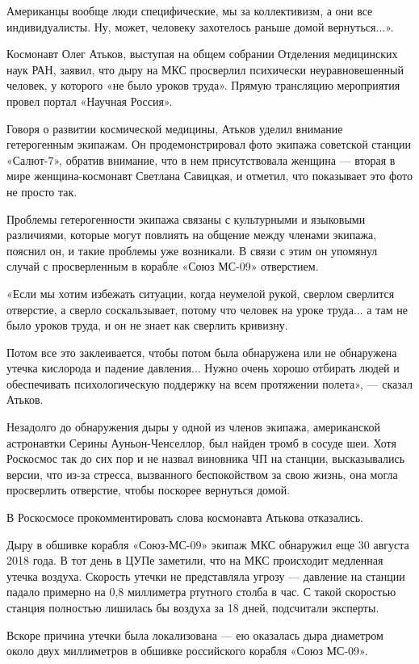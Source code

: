 \begin{itemize}
Американцы вообще люди специфические, мы за коллективизм, а они все
индивидуалисты. Ну, может, человеку захотелось раньше домой вернуться...».

Космонавт Олег Атьков, выступая на общем собрании Отделения медицинских наук
РАН, заявил, что дыру на МКС просверлил психически неуравновешенный человек, у
которого «не было уроков труда». Прямую трансляцию мероприятия провел портал
«Научная Россия».

Говоря о развитии космической медицины, Атьков уделил внимание гетерогенным
экипажам. Он продемонстрировал фото экипажа советской станции «Салют-7»,
обратив внимание, что в нем присутствовала женщина — вторая в мире
женщина-космонавт Светлана Савицкая, и отметил, что показывает это фото не
просто так.

Проблемы гетерогенности экипажа связаны с культурными и языковыми различиями,
которые могут повлиять на общение между членами экипажа, пояснил он, и такие
проблемы уже возникали. В связи с этим он упомянул случай с просверленным в
корабле «Союз МС-09» отверстием.

«Если мы хотим избежать ситуации, когда неумелой рукой, сверлом сверлится
отверстие, а сверло соскальзывает, потому что человек на уроке труда... а там
не было уроков труда, и он не знает как сверлить кривизну.

Потом все это заклеивается, чтобы потом была обнаружена или не обнаружена
утечка кислорода и падение давления... Нужно очень хорошо отбирать людей и
обеспечивать психологическую поддержку на всем протяжении полета», — сказал
Атьков.

Незадолго до обнаружения дыры у одной из членов экипажа, американской
астронавтки Серины Ауньон-Ченселлор, был найден тромб в сосуде шеи. Хотя
Роскосмос так до сих пор и не назвал виновника ЧП на станции, высказывались
версии, что из-за стресса, вызванного беспокойством за свою жизнь, она могла
просверлить отверстие, чтобы поскорее вернуться домой.

В Роскосмосе прокомментировать слова космонавта Атькова отказались.

Дыру в обшивке корабля «Союз-МС-09» экипаж МКС обнаружил еще 30 августа 2018
года. В тот день в ЦУПе заметили, что на МКС происходит медленная утечка
воздуха. Скорость утечки не представляла угрозу — давление на станции падало
примерно на 0,8 миллиметра ртутного столба в час. С такой скоростью станция
полностью лишилась бы воздуха за 18 дней, подсчитали эксперты.

Вскоре причина утечки была локализована — ею оказалась дыра диаметром около
двух миллиметров в обшивке российского корабля «Союз МС-09».


\end{itemize}
